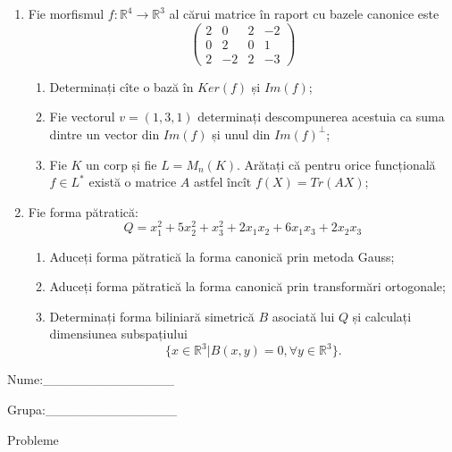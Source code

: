 \documentclass{article}
\begin{document}
\begin{enumerate}
 \item Fie morfismul $f:\mathbb{R}^4 \to \mathbb{R}^3$ al cărui matrice în raport cu bazele canonice este
$$\begin{pmatrix}
2&0&2&-2\\
0&2&0&1\\
2&-2&2&-3
\end{pmatrix}$$

\begin{enumerate}
\item Determinați cîte o bază în $Ker(f)$ și $Im(f)$;
\item Fie vectorul $v=(1,3,1)$ determinați descompunerea acestuia ca suma dintre un vector din $Im(f)$ și unul din $Im(f)^\perp$;
\item Fie $K$ un corp și fie $L=M_n(K)$. Arătați că pentru orice funcțională $f \in L^*$ există o matrice $A$ astfel încît $f(X)=Tr(AX)$;
\end{enumerate}
\item Fie forma pătratică:
$$Q= x_1^2+5x_2^2+x_3^2+2x_1x_2+6x_1x_3+2x_2x_3$$

\begin{enumerate}
\item Aduceți forma pătratică la forma canonică prin metoda Gauss;
\item Aduceți forma pătratică la forma canonică prin transformări ortogonale;
\item Determinați forma biliniară simetrică $B$ asociată lui $Q$ și calculați dimensiunea subspațiului
$$\{x \in \mathbb{R}^3 | B(x,y)=0,\forall y \in \mathbb{R}^3\}.$$

\end{enumerate}
\end{enumerate}
\newpage
\begin{flushright}
Nume:\_\_\_\_\_\_\_\_\_\_\_\_\_\_
 
 
Grupa:\_\_\_\_\_\_\_\_\_\_\_\_\_\_
\end{flushright}
\begin{center}
\vspace{2cm}
{\Large Probleme}
\vspace{2cm}
\end{center}
\end{document}
